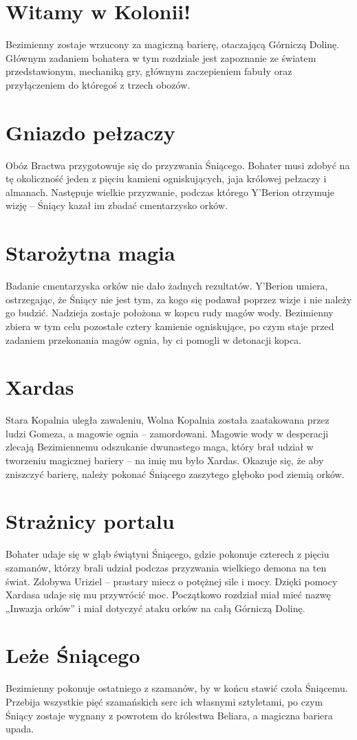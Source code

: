 \documentclass[11pt,polish, openany]{book}
\begin{document}
\section{Witamy w Kolonii!}
Bezimienny zostaje wrzucony za magiczną barierę, otaczającą Górniczą Dolinę. Głównym zadaniem bohatera w tym rozdziale jest zapoznanie ze światem przedstawionym, mechaniką gry, głównym zaczepieniem fabuły oraz przyłączeniem do któregoś z trzech obozów.
\section{Gniazdo pełzaczy}
Obóz Bractwa przygotowuje się do przyzwania Śniącego. Bohater musi zdobyć na tę okoliczność jeden z pięciu kamieni ogniskujących, jaja królowej pełzaczy i almanach. Następuje wielkie przyzwanie, podczas którego Y'Berion otrzymuje wizję – Śniący kazał im zbadać cmentarzysko orków.
\section{Starożytna magia}
Badanie cmentarzyska orków nie dało żadnych rezultatów. Y'Berion umiera, ostrzegając, że Śniący nie jest tym, za kogo się podawał poprzez wizje i nie należy go budzić. Nadzieja zostaje położona w kopcu rudy magów wody. Bezimienny zbiera w tym celu pozostałe cztery kamienie ogniskujące, po czym staje przed zadaniem przekonania magów ognia, by ci pomogli w detonacji kopca.
\section{Xardas}
Stara Kopalnia uległa zawaleniu, Wolna Kopalnia została zaatakowana przez ludzi Gomeza, a magowie ognia – zamordowani. Magowie wody w desperacji zlecają Bezimiennemu odszukanie dwunastego maga, który brał udział w tworzeniu magicznej bariery – na imię mu było Xardas. Okazuje się, że aby zniszczyć barierę, należy pokonać Śniącego zaszytego głęboko pod ziemią orków.
\section{Strażnicy portalu}
Bohater udaje się w głąb świątyni Śniącego, gdzie pokonuje czterech z pięciu szamanów, którzy brali udział podczas przyzwania wielkiego demona na ten świat. Zdobywa Uriziel – prastary miecz o potężnej sile i mocy. Dzięki pomocy Xardasa udaje się mu przywrócić moc. Początkowo rozdział miał mieć nazwę „Inwazja orków” i miał dotyczyć ataku orków na całą Górniczą Dolinę.
\section{Leże Śniącego}
Bezimienny pokonuje ostatniego z szamanów, by w końcu stawić czoła Śniącemu. Przebija wszystkie pięć szamańskich serc ich własnymi sztyletami, po czym Śniący zostaje wygnany z powrotem do królestwa Beliara, a magiczna bariera upada.
\end{document}
